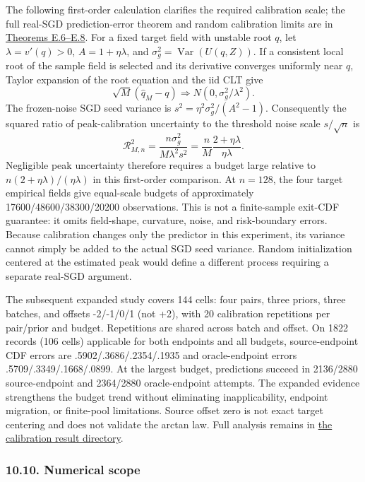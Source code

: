 The following first-order calculation clarifies the required calibration
scale; the full real-SGD prediction-error theorem and random calibration
limits are in \href{calibration.md}{Theorems E.6--E.8}. For a fixed
target field with unstable root \(q\), let \(\lambda=v'(q)>0\),
\(A=1+\eta\lambda\), and \(\sigma_g^2=\operatorname{Var}(U(q,Z))\). If a
consistent local root of the sample field is selected and its derivative
converges uniformly near \(q\), Taylor expansion of the root equation
and the iid CLT give \[
\sqrt M(\widehat q_M-q)\Rightarrow N(0,\sigma_g^2/\lambda^2).
\] The frozen-noise SGD seed variance is
\(s^2=\eta^2\sigma_g^2/(A^2-1)\). Consequently the squared ratio of
peak-calibration uncertainty to the threshold noise scale \(s/\sqrt n\)
is \[
\mathcal R_{M,n}^2
=\frac{n\sigma_g^2}{M\lambda^2s^2}
=\frac nM\frac{2+\eta\lambda}{\eta\lambda}.
\] Negligible peak uncertainty therefore requires a budget large
relative to \(n(2+\eta\lambda)/(\eta\lambda)\) in this first-order
comparison. At \(n=128\), the four target empirical fields give
equal-scale budgets of approximately 17600/48600/38300/20200
observations. This is not a finite-sample exit-CDF guarantee: it omits
field-shape, curvature, noise, and risk-boundary errors. Because
calibration changes only the predictor in this experiment, its variance
cannot simply be added to the actual SGD seed variance. Random
initialization centered at the estimated peak would define a different
process requiring a separate real-SGD argument.

The subsequent expanded study covers 144 cells: four pairs, three
priors, three batches, and offsets -2/-1/0/1 (not +2), with 20
calibration repetitions per pair/prior and budget. Repetitions are
shared across batch and offset. On 1822 records (106 cells) applicable
for both endpoints and all budgets, source-endpoint CDF errors are
.5902/.3686/.2354/.1935 and oracle-endpoint errors
.5709/.3349/.1668/.0899. At the largest budget, predictions succeed in
2136/2880 source-endpoint and 2364/2880 oracle-endpoint attempts. The
expanded evidence strengthens the budget trend without eliminating
inapplicability, endpoint migration, or finite-pool limitations. Source
offset zero is not exact target centering and does not validate the
arctan law. Full analysis remains in
\href{../experiments/results/calibration_grid/analysis.md}{the
calibration result directory}.

\subsubsection{10.10. Numerical scope}\label{experiments-numerical-scope}

